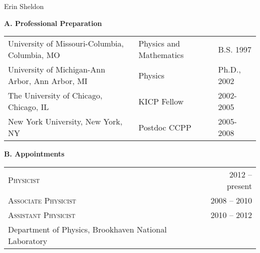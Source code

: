 \documentclass[10pt]{article}
\begin{document}
\begin{center}
{\huge \sc Erin Sheldon}\\
\end{center}


{\large \bf A. Professional Preparation}
\vspace{-0.5em}
\begin{table}[h]
\begin{tabular}{lll}
University of Missouri-Columbia, Columbia, MO & Physics and Mathematics & B.S. 1997\\
University of Michigan-Ann Arbor, Ann Arbor, MI &  Physics &  Ph.D., 2002\\
The University of Chicago, Chicago, IL & KICP Fellow & 2002-2005\\
New York University, New York, NY & Postdoc CCPP & 2005-2008\\
\end{tabular}
\end{table}

{\large \bf B. Appointments}
\vspace{-0.5em}
\begin{table}[h]
\begin{tabularx}{\textwidth}{lR}
\textsc{Physicist} & 2012 -- present\\
\textsc{Associate Physicist} & 2008 -- 2010\\
\textsc{Assistant Physicist} & 2010 -- 2012\\
Department of Physics, Brookhaven National Laboratory \\
\end{tabularx}
\end{table}
\end{document}
